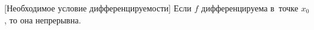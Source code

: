 [Необходимое условие дифференцируемости]\label{nudef}
Если $f$ дифференцируема в~точке $x_0$, то она непрерывна.
 
